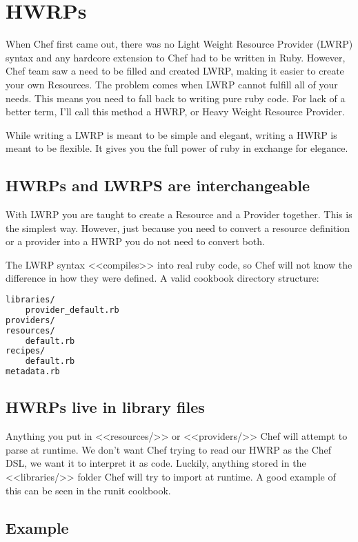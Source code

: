 \section{HWRPs}

When Chef first came out, there was no Light Weight Resource Provider (LWRP) syntax and any hardcore extension to Chef had to be written in Ruby. However, Chef team saw a need to be filled and created LWRP, making it easier to create your own Resources. The problem comes when LWRP cannot fulfill all of your needs. This means you need to fall back to writing pure ruby code. For lack of a better term, I'll call this method a HWRP, or Heavy Weight Resource Provider.

While writing a LWRP is meant to be simple and elegant, writing a HWRP is meant to be flexible. It gives you the full power of ruby in exchange for elegance.

\subsection{HWRPs and LWRPS are interchangeable}

With LWRP you are taught to create a Resource and a Provider together. This is the simplest way. However, just because you need to convert a resource definition or a provider into a HWRP you do not need to convert both.

The LWRP syntax <<compiles>> into real ruby code, so Chef will not know the difference in how they were defined. A valid cookbook directory structure:

\begin{lstlisting}[language=Bash,label=lst:cookbook-hwrp1]
libraries/
    provider_default.rb
providers/
resources/
    default.rb
recipes/
    default.rb
metadata.rb
\end{lstlisting}

\subsection{HWRPs live in library files}

Anything you put in <<resources/>> or <<providers/>> Chef will attempt to parse at runtime. We don't want Chef trying to read our HWRP as the Chef DSL, we want it to interpret it as code. Luckily, anything stored in the <<libraries/>> folder Chef will try to import at runtime. A good example of this can be seen in the runit cookbook.

\subsection{Example}

